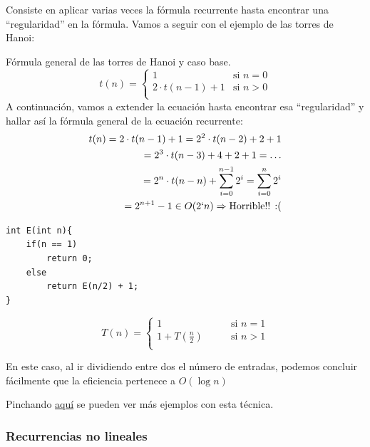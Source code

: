 \documentclass[10pt,a4paper,spanish]{report}
\theoremstyle{definition}
\theoremstyle{remark}
\begin{document}
    Consiste en aplicar varias veces la fórmula recurrente hasta encontrar una ``regularidad'' en la fórmula. Vamos a seguir con el ejemplo de las torres de Hanoi:
\begin{center}
    Fórmula general de las torres de Hanoi y caso base.
    \begin{displaymath}
        t(n) = \left\{ \begin{array}{ll}
1 & \textrm{si $n = 0$}\\
2\cdot t(n-1) + 1 & \textrm{si $n > 0$} \\
\end{array} \right.
    \end{displaymath}
    A continuación, vamos a extender la ecuación hasta encontrar esa ``regularidad'' y hallar así la fórmula general de la ecuación recurrente:
    \begin{align}
        t(n) = 2 \cdot t(n-1) + 1 = 2^2\cdot t(n-2) + 2 + 1\\
        = 2^3\cdot t(n - 3) + 4 + 2 + 1 = \ldots \\
        = 2^n\cdot t(n-n) + \sum_{i=0}^{n-1} 2^i = \sum_{i = 0}^{n} 2^i
        \\=
        2^{n+1} - 1 \in O(2`n) \Rightarrow \text{Horrible!! :(}
    \end{align}
\end{center}

\begin{verbatim}
int E(int n){
    if(n == 1)
        return 0;
    else
        return E(n/2) + 1;
}
\end{verbatim}
\begin{displaymath}
    T(n) = \left\{ \begin{array}{ll}
1 & \qquad \textrm{si $n = 1$}\\
1 +  T(\frac{n}{2})& \qquad \textrm{si $n > 1$} \\
\end{array} \right.
\end{displaymath}

En este caso, al ir dividiendo entre dos el número de entradas, podemos concluir fácilmente que la eficiencia pertenece a $O(\log{n})$

Pinchando \hyperref[recurrencias]{aquí} se pueden ver más ejemplos con esta técnica.

\subsubsection{\textcolor{YellowOrange}Recurrencias no lineales}
\end{document}
